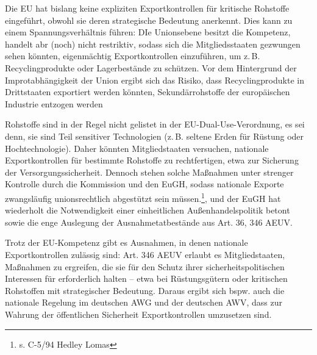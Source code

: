\documentclass[12pt,a4paper,oneside]{book} %
\begin{document}
Die EU hat bislang keine expliziten Exportkontrollen für kritische Rohstoffe eingeführt, obwohl sie deren strategische Bedeutung anerkennt. Dies kann zu einem Spannungsverhältnis führen: DIe Unionsebene besitzt die Kompetenz, handelt abr (noch) nicht restriktiv, sodass sich die Mitgliedsstaaten gezwungen  sehen könnten, eigenmächtig Exportkontrollen einzuführen, um z. B. Recyclingprodukte oder Lagerbestände zu schützen. Vor dem Hintergrund der Improtabhängigkeit der Union ergibt sich das Risiko, dass Recyclingprodukte in Drittstaaten exportiert werden könnten, Sekundärrohstoffe der europäischen Industrie entzogen werden

Rohstoffe sind in der Regel nicht gelistet in der EU-Dual-Use-Verordnung, es sei denn, sie sind Teil sensitiver Technologien (z. B. seltene Erden für Rüstung oder Hochtechnologie). Daher könnten Mitgliedstaaten versuchen, nationale Exportkontrollen für bestimmte Rohstoffe zu rechtfertigen, etwa zur Sicherung der Versorgungssicherheit. Dennoch stehen solche Maßnahmen unter strenger Kontrolle durch die Kommission und den EuGH, sodass nationale Exporte zwangsläufig unionsrechtlich abgestützt sein müssen.\footnote{s. C-5/94 Hedley Lomas}, und der EuGH hat wiederholt die Notwendigkeit einer einheitlichen Außenhandelspolitik betont sowie die enge Auslegung der Ausnahmetatbestände aus Art. 36, 346 AEUV.


Trotz der EU-Kompetenz gibt es Ausnahmen, in denen nationale Exportkontrollen zulässig sind: Art. 346 AEUV erlaubt es Mitgliedstaaten, Maßnahmen zu ergreifen, die sie für den Schutz ihrer sicherheitspolitischen Interessen für erforderlich halten – etwa bei Rüstungsgütern oder kritischen Rohstoffen mit strategischer Bedeutung. Daraus ergibt sich bspw. auch die nationale Regelung im deutschen AWG und der deutschen AWV, dass zur Wahrung der öffentlichen Sicherheit Exportkontrollen umzusetzen sind.
\end{document}
